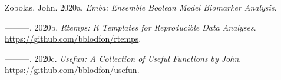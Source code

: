 \documentclass[
  12pt,
]{book}
\newlength{\cslhangindent}
\newenvironment{cslreferences}%
  {\setlength{\parindent}{0pt}%
  \everypar{\setlength{\hangindent}{\cslhangindent}}\ignorespaces}%
  {\par}
\begin{document}
\begin{cslreferences}
\leavevmode\hypertarget{ref-R-emba}{}%
Zobolas, John. 2020a. \emph{Emba: Ensemble Boolean Model Biomarker Analysis}.

\leavevmode\hypertarget{ref-R-rtemps}{}%
---------. 2020b. \emph{Rtemps: R Templates for Reproducible Data Analyses}. \url{https://github.com/bblodfon/rtemps}.

\leavevmode\hypertarget{ref-R-usefun}{}%
---------. 2020c. \emph{Usefun: A Collection of Useful Functions by John}. \url{https://github.com/bblodfon/usefun}.
\end{cslreferences}
\end{document}
